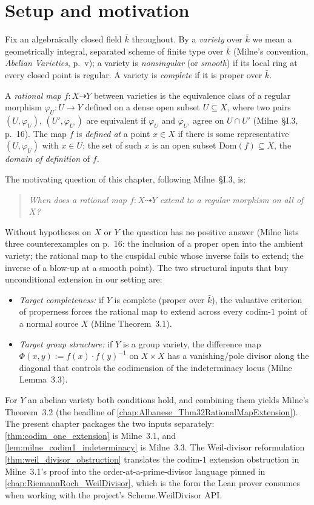 \section{Setup and motivation}
\label{sec:codim1_setup}

Fix an algebraically closed field \(\bar k\) throughout. By a \emph{variety} over \(\bar k\)
we mean a geometrically integral, separated scheme of finite type over \(\bar k\)
(Milne's convention, \emph{Abelian Varieties}, p.~v); a variety is \emph{nonsingular}
(or \emph{smooth}) if its local ring at every closed point is regular. A variety is
\emph{complete} if it is proper over \(\bar k\).

A \emph{rational map} \(f \colon X \dashrightarrow Y\) between varieties is the equivalence
class of a regular morphism \(\varphi_U \colon U \to Y\) defined on a dense open subset
\(U \subseteq X\), where two pairs \((U, \varphi_U)\), \((U', \varphi_{U'})\) are equivalent
if \(\varphi_U\) and \(\varphi_{U'}\) agree on \(U \cap U'\) (Milne~\S I.3, p.~16). The map \(f\)
is \emph{defined at} a point \(x \in X\) if there is some representative \((U, \varphi_U)\)
with \(x \in U\); the set of such \(x\) is an open subset \(\mathrm{Dom}(f) \subseteq X\),
the \emph{domain of definition} of \(f\).

The motivating question of this chapter, following Milne~\S I.3, is:
\begin{quote}
  \emph{When does a rational map \(f \colon X \dashrightarrow Y\) extend to a regular
  morphism on all of \(X\)?}
\end{quote}
Without hypotheses on \(X\) or \(Y\) the question has no positive answer (Milne lists three
counterexamples on p.~16: the inclusion of a proper open into the ambient variety; the
rational map to the cuspidal cubic whose inverse fails to extend; the inverse of a
blow-up at a smooth point). The two structural inputs that buy unconditional extension
in our setting are:
\begin{itemize}
  \item \emph{Target completeness:} if \(Y\) is complete (proper over \(\bar k\)), the
    valuative criterion of properness forces the rational map to extend across every
    codim-\(1\) point of a normal source \(X\) (Milne Theorem~3.1).
  \item \emph{Target group structure:} if \(Y\) is a group variety, the difference map
    \(\Phi(x, y) := f(x) \cdot f(y)^{-1}\) on \(X \times X\) has a vanishing/pole divisor
    along the diagonal that controls the codimension of the indeterminacy locus
    (Milne Lemma~3.3).
\end{itemize}
For \(Y\) an abelian variety both conditions hold, and combining them yields Milne's
Theorem~3.2 (the headline of \cref{chap:Albanese_Thm32RationalMapExtension}). The
present chapter packages the two inputs separately:
\cref{thm:codim_one_extension} is Milne~3.1, and
\cref{lem:milne_codim1_indeterminacy} is Milne~3.3. The Weil-divisor reformulation
\cref{thm:weil_divisor_obstruction} translates the codim-\(1\) extension obstruction
in Milne~3.1's proof into the order-at-a-prime-divisor language pinned in
\cref{chap:RiemannRoch_WeilDivisor}, which is the form the Lean prover consumes when
working with the project's \(\mathrm{Scheme.WeilDivisor}\) API.

